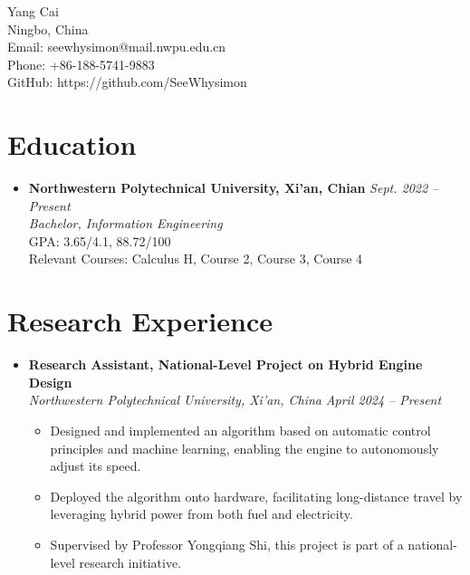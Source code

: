 \documentclass[a4paper,10pt]{article}
\begin{document}
\begin{center}
    {\LARGE Yang Cai}\\
    \vspace{0.1cm}
    Ningbo, China \\
    Email: seewhysimon@mail.nwpu.edu.cn \\
    Phone: +86-188-5741-9883 \\
    GitHub: https://github.com/SeeWhysimon
\end{center}

\section*{Education}
\begin{itemize}[leftmargin=0.5cm]
    \item \textbf{Northwestern Polytechnical University, Xi'an, Chian} \hfill \textit{Sept. 2022 -- Present} \\
    \textit{Bachelor, Information Engineering} \\
    GPA: 3.65/4.1, 88.72/100 \\
    Relevant Courses: Calculus H, Course 2, Course 3, Course 4
\end{itemize}

\section*{Research Experience}
\begin{itemize}[leftmargin=0.5cm]
    \item \textbf{Research Assistant, National-Level Project on Hybrid Engine Design} \\
    \textit{Northwestern Polytechnical University, Xi'an, China} \hfill \textit{April 2024 -- Present} 
    
    \begin{itemize}
        \item Designed and implemented an algorithm based on automatic control principles and machine learning, enabling the engine to autonomously adjust its speed.
        \item Deployed the algorithm onto hardware, facilitating long-distance travel by leveraging hybrid power from both fuel and electricity.
        \item Supervised by Professor Yongqiang Shi, this project is part of a national-level research initiative.
    \end{itemize}
    
\end{itemize}
\end{document}
